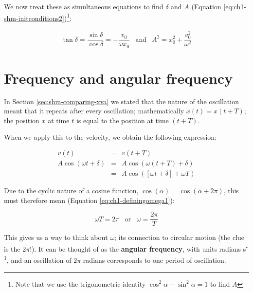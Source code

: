 \documentclass[
]{book}
\begin{document}
We now treat these as simultaneous equations to find \(\delta\) and \(A\) (Equation \eqref{eq:ch1-shm-initconditions2})\footnote{Note that we use the trigonometric identity \(\cos^2 \alpha + \sin^2 \alpha = 1\) to find \(A\)}:

\begin{equation}
\begin{array}{rcl}
\tan \delta = \dfrac{\sin \delta}{\cos \delta} = -\dfrac{v_0}{\omega x_0} & \textrm{and} & A^2 = x_0^2 + \dfrac{v_0^2}{\omega^2}
\end{array}
\label{eq:ch1-shm-initconditions2}
\end{equation}

\hypertarget{sec:shm-freq-angularfreq}{%
\section{Frequency and angular frequency}\label{sec:shm-freq-angularfreq}}

In Section \ref{sec:shm-comparing-xva} we stated that the nature of the oscillation meant that it repeats after every oscillation; mathematically \(x(t) = x(t + T)\); the position \(x\) at time \(t\) is equal to the position at time \((t+T)\).

When we apply this to the velocity, we obtain the following expression:

\begin{equation}
\begin{array}{rcl}
v(t) &=& v(t+T) \\
A \cos (\omega t + \delta) &=& A \cos (\omega (t+T) + \delta) \\
&=& A \cos ([\omega t + \delta] + \omega T)
\end{array}
\end{equation}

Due to the cyclic nature of a cosine function, \(\cos (\alpha) = \cos (\alpha + 2\pi)\), this must therefore mean (Equation \eqref{eq:ch1-definingomega1}):

\begin{equation}
\omega T = 2\pi \hspace{10pt} \textrm{or} \hspace{10pt} \omega = \frac{2\pi}{T}
\label{eq:ch1-definingomega1}
\end{equation}

This gives us a way to think about \(\omega\); its connection to circular motion (the clue is the \(2\pi\)!). It can be thought of as the \textbf{angular frequency}, with units radians s\textsuperscript{-1}, and an oscillation of \(2\pi\) radians corresponds to one period of oscillation.
\end{document}

